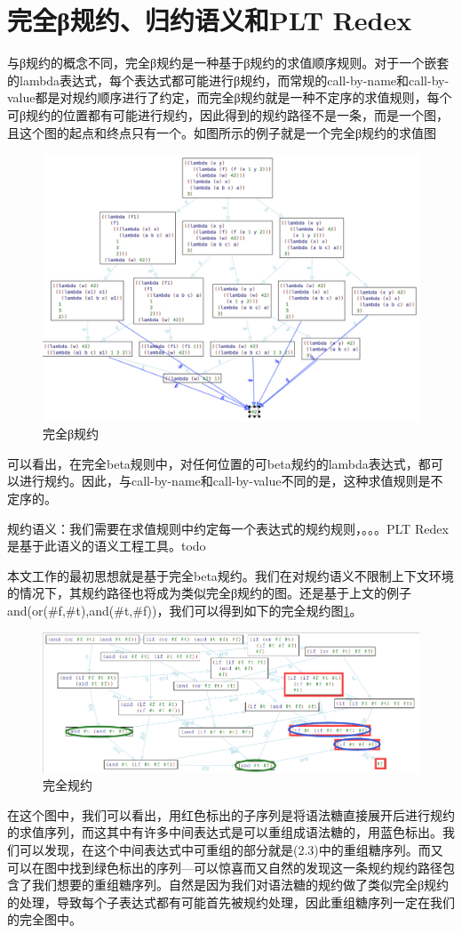\section{完全β规约、归约语义和PLT Redex}
与β规约的概念不同，完全β规约是一种基于β规约的求值顺序规则。对于一个嵌套的lambda表达式，每个表达式都可能进行β规约，而常规的call-by-name和call-by-value都是对规约顺序进行了约定，而完全β规约就是一种不定序的求值规则，每个可β规约的位置都有可能进行规约，因此得到的规约路径不是一条，而是一个图，且这个图的起点和终点只有一个。如图所示的例子就是一个完全β规约的求值图

\begin{figure}[h]
	\centering
	\includegraphics[width=12cm]{images/chapter2/fullbeta.png}
	\caption{完全β规约}
\end{figure}

可以看出，在完全beta规则中，对任何位置的可beta规约的lambda表达式，都可以进行规约。因此，与call-by-name和call-by-value不同的是，这种求值规则是不定序的。


规约语义：我们需要在求值规则中约定每一个表达式的规约规则，。。。PLT Redex是基于此语义的语义工程工具。todo

本文工作的最初思想就是基于完全beta规约。我们在对规约语义不限制上下文环境的情况下，其规约路径也将成为类似完全β规约的图。还是基于上文的例子and(or(\#f,\#t),and(\#t,\#f))，我们可以得到如下的完全规约图\ref{fig:full_reduction}。

\begin{figure}[h]
	\centering
	\includegraphics[width=12cm]{images/chapter2/fullreduction.png}
	\caption{完全规约}
	\label{fig:full_reduction}
\end{figure}

在这个图中，我们可以看出，用红色标出的子序列是将语法糖直接展开后进行规约的求值序列，而这其中有许多中间表达式是可以重组成语法糖的，用蓝色标出。我们可以发现，在这个中间表达式中可重组的部分就是(2.3)中的重组糖序列。而又可以在图中找到绿色标出的序列---可以惊喜而又自然的发现这一条规约规约路径包含了我们想要的重组糖序列。自然是因为我们对语法糖的规约做了类似完全β规约的处理，导致每个子表达式都有可能首先被规约处理，因此重组糖序列一定在我们的完全图中。
